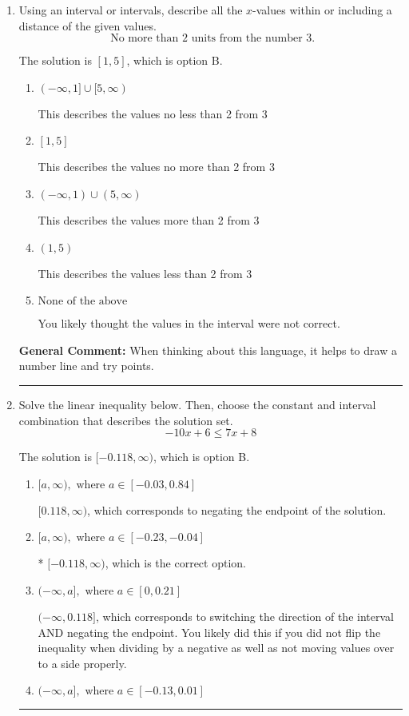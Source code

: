 \documentclass{extbook}[14pt]
\newcommand{\litem}[1]{\item #1

\rule{\textwidth}{0.4pt}}
\begin{document}
\begin{enumerate}\litem{
Using an interval or intervals, describe all the $x$-values within or including a distance of the given values.
\[ \text{ No more than } 2 \text{ units from the number } 3. \]

The solution is \( [1, 5] \), which is option B.\begin{enumerate}[label=\Alph*.]
\item \( (-\infty, 1] \cup [5, \infty) \)

This describes the values no less than 2 from 3
\item \( [1, 5] \)

This describes the values no more than 2 from 3
\item \( (-\infty, 1) \cup (5, \infty) \)

This describes the values more than 2 from 3
\item \( (1, 5) \)

This describes the values less than 2 from 3
\item \( \text{None of the above} \)

You likely thought the values in the interval were not correct.
\end{enumerate}

\textbf{General Comment:} When thinking about this language, it helps to draw a number line and try points.
}
\litem{
Solve the linear inequality below. Then, choose the constant and interval combination that describes the solution set.
\[ -10x + 6 \leq 7x + 8 \]

The solution is \( [-0.118, \infty) \), which is option B.\begin{enumerate}[label=\Alph*.]
\item \( [a, \infty), \text{ where } a \in [-0.03, 0.84] \)

 $[0.118, \infty)$, which corresponds to negating the endpoint of the solution.
\item \( [a, \infty), \text{ where } a \in [-0.23, -0.04] \)

* $[-0.118, \infty)$, which is the correct option.
\item \( (-\infty, a], \text{ where } a \in [0, 0.21] \)

 $(-\infty, 0.118]$, which corresponds to switching the direction of the interval AND negating the endpoint. You likely did this if you did not flip the inequality when dividing by a negative as well as not moving values over to a side properly.
\item \( (-\infty, a], \text{ where } a \in [-0.13, 0.01] \)


\end{enumerate}}
\end{enumerate}
\end{document}
